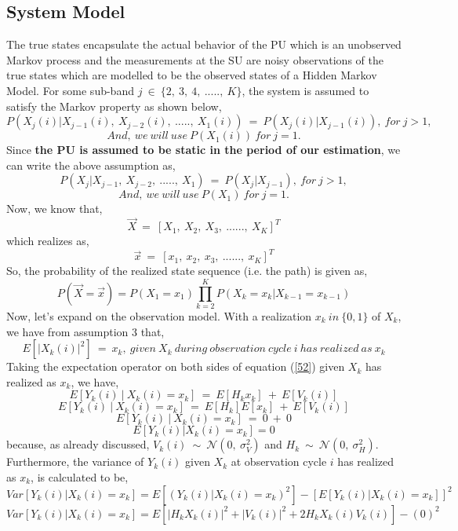 \documentclass[12pt, draftcls, onecolumn]{IEEEtran}
\begin{document}
\subsection{System Model}
The true states encapsulate the actual behavior of the PU which is an unobserved Markov process and the measurements at the SU are noisy observations of the true states which are modelled to be the observed states of a Hidden Markov Model.
For some sub-band $j\ \in\ \{2,\ 3,\ 4,\ .....,\ K\}$, the system is assumed to satisfy the Markov property as shown below,
\[P(X_{j}(i)|X_{j-1}(i),\ X_{j-2}(i),\ .....,\ X_1(i))\ =\ P(X_{j}(i)|X_{j-1}(i)),\ for\ j>1,\]
\[And,\ we\ will\ use\ P(X_1(i))\ for\ j=1.\]
Since \textbf{the PU is assumed to be static in the period of our estimation}, we can write the above assumption as,
\[P(X_{j}|X_{j-1},\ X_{j-2},\ .....,\ X_1)\ =\ P(X_{j}|X_{j-1}),\ for\ j>1,\]
\[And,\ we\ will\ use\ P(X_1)\ for\ j=1.\]
Now, we know that,
\[\vec{X}\ =\ [X_1,\ X_2,\ X_3,\ ......,\ X_K]^T\] which realizes as,
\[\vec{x}\ =\ [x_1,\ x_2,\ x_3,\ ......,\ x_K]^T\]
So, the probability of the realized state sequence (i.e. the path) is given as,
\begin{equation}\label{54}
    P(\vec{X}=\vec{x}) = P(X_1=x_1) \prod_{k=2}^{K} P(X_k=x_k|X_{k-1}=x_{k-1})
\end{equation}
Now, let's expand on the observation model. With a realization $x_k\ in\ \{0,1\}$ of $X_k$, we have from assumption 3 that,
\[E[|X_k(i)|^2]\ =\ x_k,\ given\ X_k\ during\ observation\ cycle\ i\ has\ realized\ as\ x_k\]
Taking the expectation operator on both sides of equation (\ref{52}) given $X_k$ has realized as $x_k$, we have,
\[E[Y_k(i)\ |\ X_k(i)=x_k]\ =\ E[H_kx_k]\ +\ E[V_k(i)]\]
\[E[Y_k(i)\ |\ X_k(i)=x_k]\ =\ E[H_k]E[x_k]\ +\ E[V_k(i)]\]
\[E[Y_k(i)\ |\ X_k(i)=x_k]\ =\ 0\ +\ 0\]
\begin{equation}\label{55}
    E[Y_k(i) | X_k(i) = x_k] = 0
\end{equation}
because, as already discussed, $V_k(i)\ \sim\ \mathcal{N}(0,\ \sigma_V^2)$ and $H_k\ \sim\ \mathcal{N}(0,\ \sigma_H^2)$.
\\Furthermore, the variance of $Y_k(i)$ given $X_k$ at observation cycle $i$ has realized as $x_k$, is calculated to be, 
\begin{equation*}
    Var[Y_k(i) | X_k(i) = x_k] = E[(Y_k(i) | X_k(i) = x_k)^2] - [E[Y_k(i) | X_k(i) = x_k]]^2
\end{equation*}
\begin{equation*}
    Var[Y_k(i) | X_k(i) = x_k] = E[|H_kX_k(i)|^2 + |V_k(i)|^2 + 2H_kX_k(i)V_k(i)] - (0)^2
\end{equation*}
\end{document}
